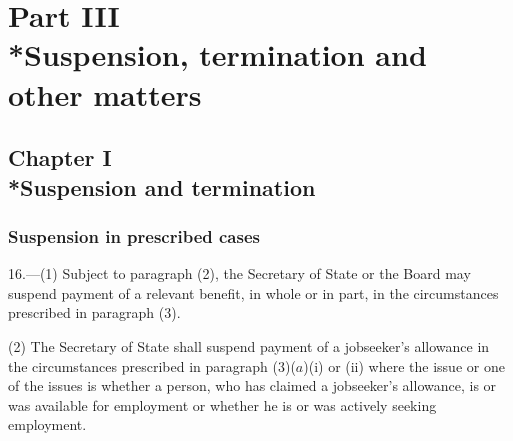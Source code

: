\documentclass[12pt,a4paper]{article}
\begin{document}
\section[Part III --- Suspension, termination and other matters]{Part III\\*Suspension, termination and other matters}

\subsection[Chapter I --- Suspension and termination]{Chapter I\\*Suspension and termination}

\subsubsection[16. Suspension in prescribed cases]{Suspension in prescribed cases}

\renewcommand\parthead{--- Part III Chapter I}

16.—(1) Subject to paragraph (2), the Secretary of State 
or the Board  %
may suspend payment of a relevant benefit, in whole or in part, in the circumstances prescribed in paragraph (3).

(2) The Secretary of State shall suspend payment of a jobseeker’s allowance in the circumstances prescribed in paragraph (3)($a$)(i) or (ii) where the issue or one of the issues is whether a person, who has claimed a jobseeker’s allowance, is or was available for employment or whether he is or was actively seeking employment.
\end{document}
